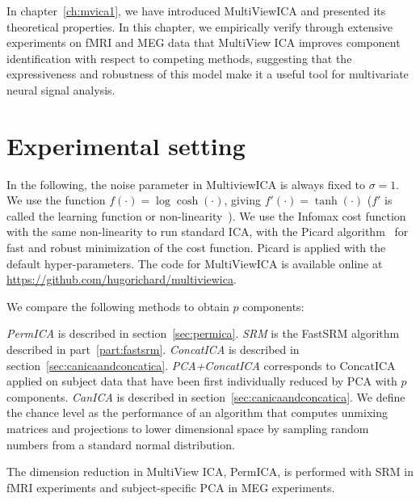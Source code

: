 In chapter~\ref{ch:mvica1}, we have introduced MultiViewICA and presented its
theoretical properties.
In this chapter, we empirically verify through extensive experiments on fMRI and
MEG data that MultiView ICA improves component identification with respect to competing methods, suggesting that the expressiveness and robustness of this model make it a useful tool for multivariate neural signal analysis.

\section{Experimental setting}
\label{sec:expts}
In the following, the noise parameter in MultiviewICA is always fixed to $\sigma =1$.
We use the function $f(\cdot)= \log\cosh(\cdot)$, giving $f'(\cdot) =
\tanh(\cdot)$ ($f'$ is called the learning function or non-linearity~\cite{hyvarinen1998independent}).
We use the Infomax cost function~\cite{bell1995information} with the same non-linearity to run standard ICA, with the Picard algorithm~\cite{ablin2018faster} for fast and robust minimization of the cost function. Picard is applied with the default hyper-parameters.
The code for MultiViewICA is available online at \url{https://github.com/hugorichard/multiviewica}.
%

We compare the following methods to obtain $p$ components:

\emph{PermICA} is described in section~\ref{sec:permica}.
%
\emph{SRM} is the FastSRM algorithm described in part~\ref{part:fastsrm}.
%
\emph{ConcatICA} is described in section~\ref{sec:canicaandconcatica}.
%
\emph{PCA+ConcatICA} corresponds to ConcatICA applied on subject data that have been first individually reduced by PCA with $p$ components. 
%
\emph{CanICA} is described in section~\ref{sec:canicaandconcatica}.
We define the chance level as the performance of an algorithm that computes unmixing matrices and projections to lower dimensional space by sampling random numbers from a standard normal distribution. 
% 

The  dimension reduction in MultiView ICA, PermICA,
 is performed with SRM in
fMRI experiments and subject-specific PCA in MEG experiments.


